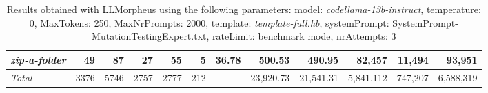\begin{table*}
{\begin{tabular}{l||r|r|r|r|r|r||r|r||r|r|r}
   \hline
   \textit{zip-a-folder} & 49 & 87 & 27 & 55 & 5 & 36.78 & 500.53 & 490.95 & 82,457 & 11,494 & 93,951 \\ 
   \hline
   \textit{Total} & 3376 & 5746 & 2757 & 2777 & 212 & - & 23,920.73  & 21,541.31 & 5,841,112 & 747,207 & 6,588,319 \\ 
 \end{tabular}
 }
 \caption{Results obtained with LLMorpheus using the following parameters: 
   model: \textit{codellama-13b-instruct}, 
   temperature: 0, 
   MaxTokens: 250, 
   MaxNrPrompts: 2000, 
   template: \textit{template-full.hb}, 
   systemPrompt: SystemPrompt-MutationTestingExpert.txt, 
   rateLimit: benchmark mode, 
   nrAttempts: 3  
 }
\end{table*}

